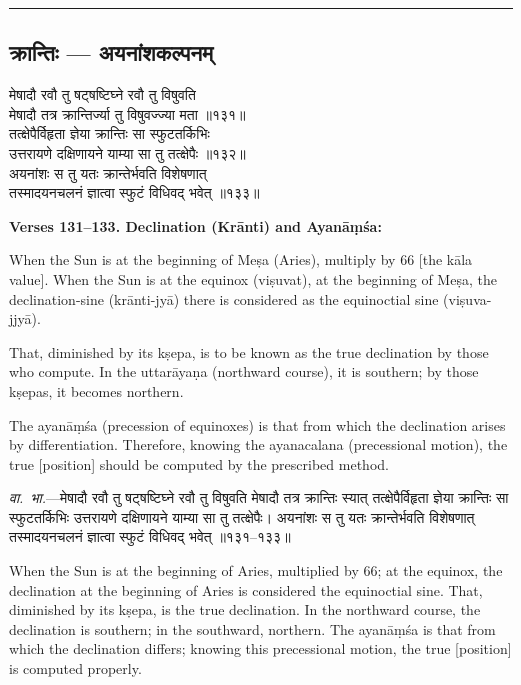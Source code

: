 \documentclass[11pt,a4paper]{article}
\newcommand{\longline}{\noindent\rule{\textwidth}{0.4pt}}
\newcommand{\dev}[1]{{\devanagarifont #1}}
\newcommand{\sectsep}{\par\vspace{0.8em}\longline\vspace{0.8em}}
\begin{document}
\sectsep

\subsection{\dev{क्रान्तिः --- अयनांशकल्पनम्}}

\begin{minipage}[t]{0.48\textwidth}
\small\devanagarifont
मेषादौ रवौ तु षट्षष्टिघ्ने रवौ तु विषुवति\\
मेषादौ तत्र क्रान्तिर्ज्या तु विषुवज्ज्या मता ॥१३१॥\\[0.5em]
तत्क्षेपैर्विहृता ज्ञेया क्रान्तिः सा स्फुटतर्किभिः\\
उत्तरायणे दक्षिणायने याम्या सा तु तत्क्षेपैः ॥१३२॥\\[0.5em]
अयनांशः स तु यतः क्रान्तेर्भवति विशेषणात्\\
तस्मादयनचलनं ज्ञात्वा स्फुटं विधिवद् भवेत् ॥१३३॥
\end{minipage}%
\hfill
\begin{minipage}[t]{0.48\textwidth}
\small
\textbf{Verses 131--133. Declination (Kr\=anti) and Ayan\=a\d{m}\'sa:}

When the Sun is at the beginning of Me\d{s}a (Aries), multiply by 66 [the k\=ala value]. When the Sun is at the equinox (vi\d{s}uvat), at the beginning of Me\d{s}a, the declination-sine (kr\=anti-jy\=a) there is considered as the equinoctial sine (vi\d{s}uva-jjy\=a).

That, diminished by its k\d{s}epa, is to be known as the true declination by those who compute. In the uttar\=aya\d{n}a (northward course), it is southern; by those k\d{s}epas, it becomes northern.

The ayan\=a\d{m}\'sa (precession of equinoxes) is that from which the declination arises by differentiation. Therefore, knowing the ayanacalana (precessional motion), the true [position] should be computed by the prescribed method.
\end{minipage}

\vspace{0.5em}
\begin{minipage}[t]{0.48\textwidth}
\small\devanagarifont
\textit{वा.~भा.}---मेषादौ रवौ तु षट्षष्टिघ्ने रवौ तु विषुवति मेषादौ तत्र क्रान्तिः स्यात् तत्क्षेपैर्विहृता ज्ञेया क्रान्तिः सा स्फुटतर्किभिः उत्तरायणे दक्षिणायने याम्या सा तु तत्क्षेपैः। अयनांशः स तु यतः क्रान्तेर्भवति विशेषणात् तस्मादयनचलनं ज्ञात्वा स्फुटं विधिवद् भवेत् ॥१३१--१३३॥
\end{minipage}%
\hfill
\begin{minipage}[t]{0.48\textwidth}
\small
When the Sun is at the beginning of Aries, multiplied by 66; at the equinox, the declination at the beginning of Aries is considered the equinoctial sine. That, diminished by its k\d{s}epa, is the true declination. In the northward course, the declination is southern; in the southward, northern. The ayan\=a\d{m}\'sa is that from which the declination differs; knowing this precessional motion, the true [position] is computed properly.
\end{minipage}
\end{document}
